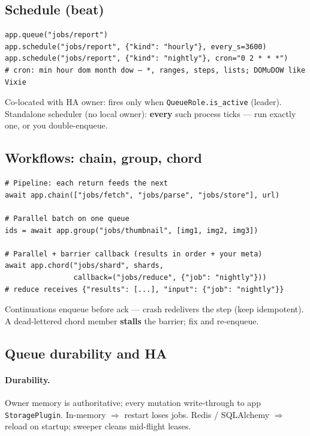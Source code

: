 \documentclass[11pt,a4paper]{article}
\begin{document}
\subsection{Schedule (beat)}

\begin{lstlisting}
app.queue("jobs/report")
app.schedule("jobs/report", {"kind": "hourly"}, every_s=3600)
app.schedule("jobs/report", {"kind": "nightly"}, cron="0 2 * * *")
# cron: min hour dom month dow — *, ranges, steps, lists; DOM∪DOW like Vixie
\end{lstlisting}

\begin{warnbox}
Co-located with HA owner: fires only when \texttt{QueueRole.is\_active} (leader).\\
Standalone scheduler (no local owner): \textbf{every} such process ticks --- run
exactly one, or you double-enqueue.
\end{warnbox}

\subsection{Workflows: chain, group, chord}

\begin{lstlisting}
# Pipeline: each return feeds the next
await app.chain(["jobs/fetch", "jobs/parse", "jobs/store"], url)

# Parallel batch on one queue
ids = await app.group("jobs/thumbnail", [img1, img2, img3])

# Parallel + barrier callback (results in order + your meta)
await app.chord("jobs/shard", shards,
                callback=("jobs/reduce", {"job": "nightly"}))
# reduce receives {"results": [...], "input": {"job": "nightly"}}
\end{lstlisting}

Continuations enqueue before ack --- crash redelivers the step (keep idempotent).
A dead-lettered chord member \textbf{stalls} the barrier; fix and re-enqueue.

\subsection{Queue durability and HA}

\paragraph{Durability.} Owner memory is authoritative; every mutation write-through
to app \texttt{StoragePlugin}. In-memory $\Rightarrow$ restart loses jobs. Redis /
SQLAlchemy $\Rightarrow$ reload on startup; sweeper cleans mid-flight leases.
\end{document}
